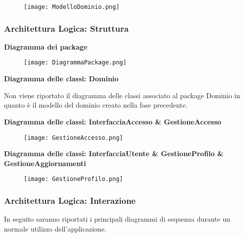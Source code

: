\begin{figure}[h!]
    \begin{center}
        \texttt{[image: ModelloDominio.png]}
    \end{center}
\end{figure}
\hfill \break

\newpage
\subsubsection{Architettura Logica: Struttura}
\hfill \break

\textbf{Diagramma dei package}
\hfill \break

\begin{figure}[h!]
    \begin{center}
        \texttt{[image: DiagrammaPackage.png]}
    \end{center}
\end{figure}
\hfill \break

\textbf{Diagramma delle classi: Dominio}
\hfill \break

Non viene riportato il diagramma delle classi associato al package Dominio in quanto è il modello del dominio creato nella fase precedente.

\newpage

\textbf{Diagramma delle classi: InterfacciaAccesso \& GestioneAccesso}
\hfill \break

\begin{figure}[h!]
    \begin{center}
        \texttt{[image: GestioneAccesso.png]}
    \end{center}
\end{figure}
\hfill \break

\textbf{Diagramma delle classi: InterfacciaUtente \& GestioneProfilo \& GestioneAggiornamenti }

\begin{figure}[h!]
    \begin{center}
        \texttt{[image: GestioneProfilo.png]}
    \end{center}
\end{figure}
\hfill \break
\newpage

\subsubsection{Architettura Logica: Interazione}

In seguito saranno riportati i principali diagrammi di sequenza durante un normale utilizzo dell'applicazione.
\hfill \break

